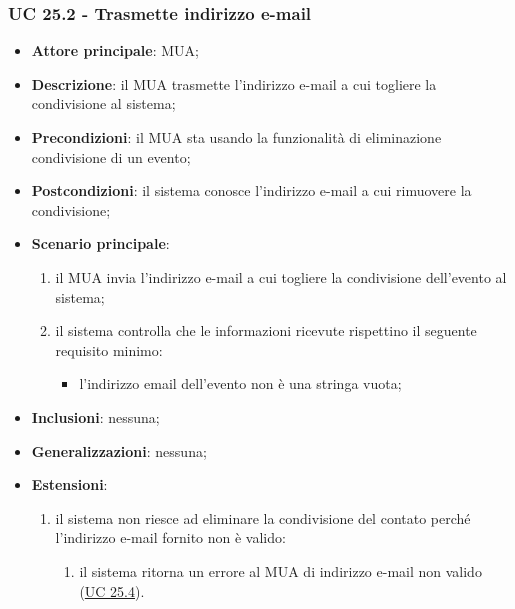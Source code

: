     \subsubsection{UC 25.2 - Trasmette indirizzo e-mail} \label{sec:UC25.2}
    \begin{itemize}
        \item \textbf{Attore principale}: MUA;
        \item \textbf{Descrizione}: il MUA trasmette l'indirizzo e-mail a cui togliere la condivisione al sistema;
        \item \textbf{Precondizioni}: il MUA sta usando la funzionalità di eliminazione condivisione di un evento;
        \item \textbf{Postcondizioni}: il sistema conosce l'indirizzo e-mail a cui rimuovere la condivisione;
        \item \textbf{Scenario principale}:
            \begin{enumerate}
                \item il MUA invia l'indirizzo e-mail a cui togliere la condivisione dell'evento al sistema;
                \item il sistema controlla che le informazioni ricevute rispettino il seguente requisito minimo:
                    \begin{itemize}
                        \item l'indirizzo email dell'evento non è una stringa vuota;
                    \end{itemize}
            \end{enumerate}
        \item \textbf{Inclusioni}: nessuna;
        \item \textbf{Generalizzazioni}: nessuna;
        \item \textbf{Estensioni}:
            \begin{enumerate}[label=\alph*.]
                \item il sistema non riesce ad eliminare la condivisione del contato perché l'indirizzo e-mail fornito non è valido:
                \begin{enumerate}[label=\arabic*.]
                    \item il sistema ritorna un errore al MUA di indirizzo e-mail non valido (\hyperref[sec:UC25.4]{UC 25.4}).
                \end{enumerate}
            \end{enumerate}
    \end{itemize}


